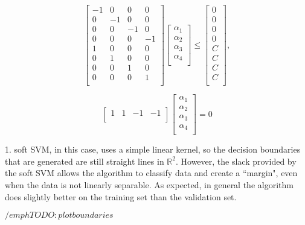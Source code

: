 \documentclass[10pt]{article}
\begin{document}
\[
\begin{bmatrix}
    -1 & 0 & 0 & 0 \\
    0 & -1 & 0 & 0 \\
    0 & 0 & -1 & 0 \\
    0 & 0 & 0 & -1 \\
    1 & 0 & 0 &0 \\
    0 & 1 & 0 & 0 \\
    0 & 0 & 1 & 0 \\
    0 & 0 & 0 & 1 \\
\end{bmatrix}
\begin{bmatrix}
    \alpha_1 \\
    \alpha_2 \\
    \alpha_3 \\
    \alpha_4 \\
\end{bmatrix} 
\leq
\begin{bmatrix}
0 \\
0 \\ 
0 \\ 
0 \\ 
C \\
C \\ 
C \\ 
C \\
\end{bmatrix},
\]

\[
\begin{bmatrix}
    1 & 1 & -1 & -1 \\
\end{bmatrix}
\begin{bmatrix}
    \alpha_1 \\
    \alpha_2 \\
    \alpha_3 \\
    \alpha_4 \\
\end{bmatrix} 
= 0
\]

1. soft SVM, in this case, uses a simple linear kernel, so the decision boundaries that are generated are still straight lines in $\mathbb{R}^2$. However, the slack provided by the soft SVM allows the algorithm to classify data and create a ``margin", even when the data is not linearly separable. As expected, in general the algorithm does slightly better on the training set than the validation set. 

$/emph{TODO: plot boundaries}$
\end{document}
